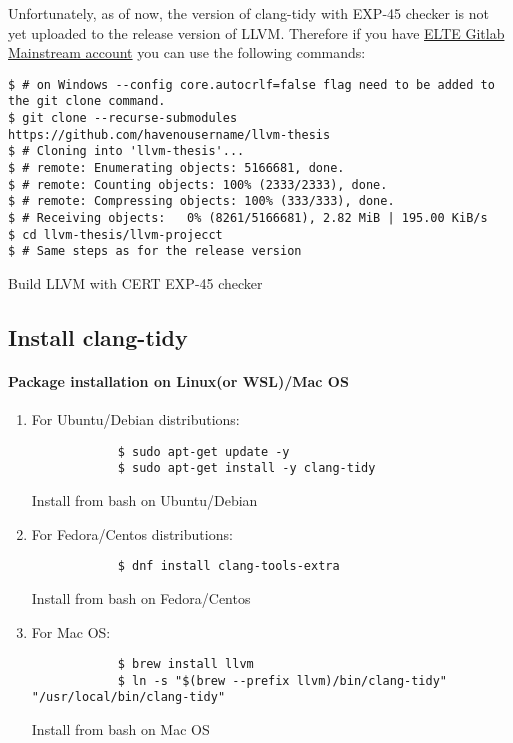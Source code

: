 Unfortunately, as of now, the version of clang-tidy with EXP-45 checker is not yet uploaded to the release version of LLVM. Therefore if you have \href{https://mainstream.inf.elte.hu/}{ELTE Gitlab Mainstream account} you can use the following commands: 
\begin{listing}[H]
\begin{verbatim}
$ # on Windows --config core.autocrlf=false flag need to be added to the git clone command.
$ git clone --recurse-submodules https://github.com/havenousername/llvm-thesis
$ # Cloning into 'llvm-thesis'...
$ # remote: Enumerating objects: 5166681, done.
$ # remote: Counting objects: 100% (2333/2333), done.
$ # remote: Compressing objects: 100% (333/333), done.
$ # Receiving objects:   0% (8261/5166681), 2.82 MiB | 195.00 KiB/s
$ cd llvm-thesis/llvm-projecct
$ # Same steps as for the release version
\end{verbatim}
\caption{Build LLVM with CERT EXP-45 checker}
\label{code:build-llvm-exp45-usr}
\end{listing}


\subsection{Install clang-tidy}

\paragraph{Package installation on Linux(or WSL)/Mac OS\\}

\begin{enumerate}
    \item For Ubuntu/Debian distributions: 
        \begin{listing}[h]
        \begin{verbatim}
            $ sudo apt-get update -y
            $ sudo apt-get install -y clang-tidy
        \end{verbatim}
        \caption{Install from bash on Ubuntu/Debian}
        \label{code:install-debian}
        \end{listing}
    \item For Fedora/Centos distributions: 
        \begin{listing}[h]
        \begin{verbatim}
            $ dnf install clang-tools-extra
        \end{verbatim}
        \caption{Install from bash on Fedora/Centos}
        \label{code:install-fedora}
        \end{listing}
    \item For Mac OS:
        \begin{listing}[h]
        \begin{verbatim}
            $ brew install llvm
            $ ln -s "$(brew --prefix llvm)/bin/clang-tidy" "/usr/local/bin/clang-tidy"
        \end{verbatim}
        \caption{Install from bash on Mac OS}
        \label{code:install-fedora}
        \end{listing}
\end{enumerate}

